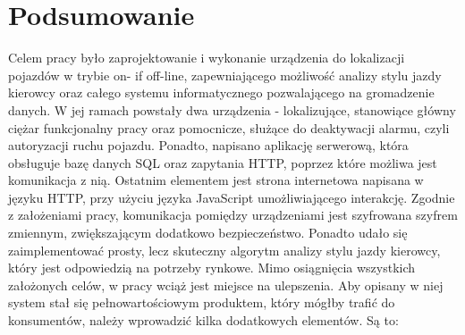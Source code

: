 \chapter{Podsumowanie}
\label{summary}

Celem pracy było zaprojektowanie i wykonanie urządzenia do lokalizacji pojazdów w trybie on- if off-line, zapewniającego możliwość analizy stylu jazdy kierowcy oraz całego systemu informatycznego pozwalającego na gromadzenie danych. W jej ramach powstały dwa urządzenia - lokalizujące, stanowiące główny ciężar funkcjonalny pracy oraz pomocnicze, służące do deaktywacji alarmu, czyli autoryzacji ruchu pojazdu. Ponadto, napisano aplikację serwerową, która obsługuje bazę danych SQL oraz zapytania HTTP, poprzez które możliwa jest komunikacja z nią. Ostatnim elementem jest strona internetowa napisana w języku HTTP, przy użyciu języka JavaScript umożliwiającego interakcję. Zgodnie z założeniami pracy, komunikacja pomiędzy urządzeniami jest szyfrowana szyfrem zmiennym, zwiększającym dodatkowo bezpieczeństwo. Ponadto udało się zaimplementować prosty, lecz skuteczny algorytm analizy stylu jazdy kierowcy, który jest odpowiedzią na potrzeby rynkowe. 
Mimo osiągnięcia wszystkich założonych celów, w pracy wciąż jest miejsce na ulepszenia. Aby opisany w niej system stał się pełnowartościowym produktem, który mógłby trafić do konsumentów, należy wprowadzić kilka dodatkowych elementów. Są to:

